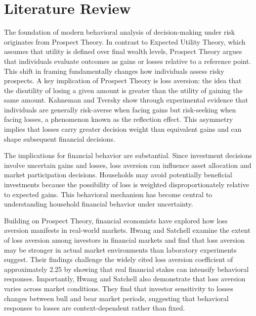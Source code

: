 \documentclass[12pt]{article}
\begin{document}
\section{Literature Review}

The foundation of modern behavioral analysis of decision-making under risk originates from
\citep{kahneman1979prospect} Prospect Theory. In contrast to Expected Utility Theory,
which assumes that utility is defined over final wealth levels, Prospect Theory argues that
individuals evaluate outcomes as gains or losses relative to a reference point. This shift in
framing fundamentally changes how individuals assess risky prospects. A key implication of
Prospect Theory is loss aversion: the idea that the disutility of losing a given amount is
greater than the utility of gaining the same amount. Kahneman and Tversky \citep{kahneman1979prospect} show through experimental evidence that individuals are generally risk-averse when facing gains but risk-seeking when facing losses, a phenomenon known as the reflection effect. This asymmetry implies that losses carry greater decision weight than equivalent gains and can shape subsequent financial decisions.

The implications for financial behavior are substantial. Since investment decisions involve
uncertain gains and losses, loss aversion can influence asset allocation and market participation
decisions. Households may avoid potentially beneficial investments because the possibility
of loss is weighted disproportionately relative to expected gains. This behavioral mechanism
has become central to understanding household financial behavior under uncertainty.

Building on Prospect Theory, financial economists have explored how loss aversion manifests
in real-world markets. Hwang and Satchell \citep{hwang2010loss} examine the extent of loss aversion among investors in financial markets and find that loss aversion may be stronger in actual market environments than laboratory experiments suggest. Their findings challenge the widely cited loss aversion coefficient of approximately 2.25 by showing that real financial stakes can intensify behavioral responses. Importantly, Hwang and Satchell \citep{hwang2010loss} also demonstrate that loss aversion varies across market conditions. They find that investor sensitivity to losses changes between bull and bear market periods, suggesting that behavioral responses to losses are context-dependent rather than fixed.
\end{document}
